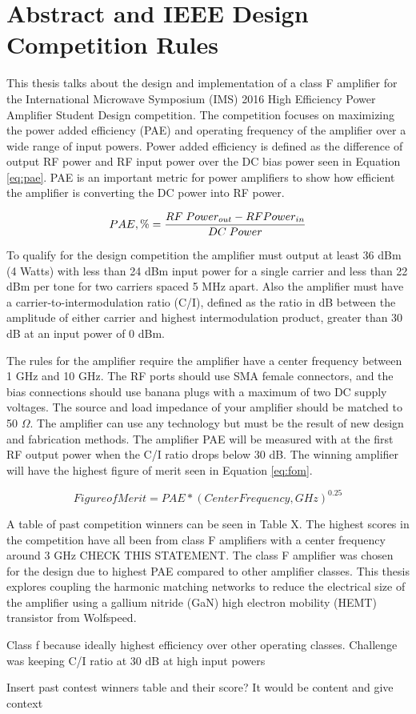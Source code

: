 \chapter{Abstract and IEEE Design Competition Rules}

This thesis talks about the design and implementation of a class F amplifier for the International Microwave Symposium (IMS) 2016 High Efficiency Power Amplifier Student Design competition. The competition focuses on maximizing the power added efficiency (PAE) and operating frequency of the amplifier over a wide range of input powers. Power added efficiency is defined as the difference of output RF power and RF input power over the DC bias power seen in Equation \ref{eq:pae}. PAE is an important metric for power amplifiers to show how efficient the amplifier is converting the DC power into RF power.

\begin{equation}\label{eq:pae}
  PAE,\% = \frac{RF\;Power_{out} - RF\\Power_{in}}{DC\;Power}
\end{equation}

To qualify for the design competition the amplifier must output at least 36 dBm (4 Watts) with less than 24 dBm input power for a single carrier and less than 22 dBm per tone for two carriers spaced 5 MHz apart. Also the amplifier must have a carrier-to-intermodulation ratio (C/I), defined as the ratio in dB between the amplitude of either carrier and highest intermodulation product, greater than 30 dB at an input power of 0 dBm.

The rules for the amplifier require the amplifier have a center frequency between 1 GHz and 10 GHz. The RF ports should use SMA female connectors, and the bias connections should use banana plugs with a maximum of two DC supply voltages. The source and load impedance of your amplifier should be matched to 50 $\Omega$. The amplifier can use any technology but must be the result of new design and fabrication methods. The amplifier PAE will be measured with at the first RF output power when the C/I ratio drops below 30 dB. The winning amplifier will have the highest figure of merit seen in Equation \ref{eq:fom}.

\begin{equation}\label{eq:fom}
  Figure of Merit = PAE*(Center Frequency, GHz)^{0.25}
\end{equation}

A table of past competition winners can be seen in Table X. The highest scores in the competition have all been from class F amplifiers with a center frequency around 3 GHz CHECK THIS STATEMENT. The class F amplifier was chosen for the design due to highest PAE compared to other amplifier classes. This thesis explores coupling the harmonic matching networks to reduce the electrical size of the amplifier using a gallium nitride (GaN) high electron mobility (HEMT) transistor from Wolfspeed.

Class f because ideally highest efficiency over other operating classes. Challenge was keeping C/I ratio at 30 dB at high input powers

Insert past contest winners table and their score? It would be content and give context